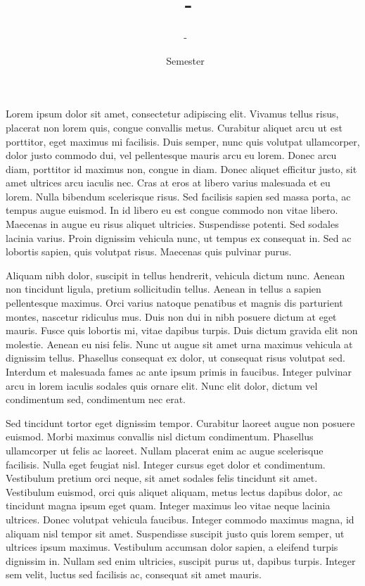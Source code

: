 \documentclass[12pt]{article}
\title{\COURSECODE\ - \FULLCOURSENAME}
\author{\PROFESSORNAME\ - \STUDENTNAME}
\date{\SEMESTER\ Semester \YEAR}
\theoremstyle{plain}
\theoremstyle{definition}
\begin{document}
\maketitle

\hfill


Lorem ipsum dolor sit amet, consectetur adipiscing elit. Vivamus tellus risus, placerat non lorem quis, congue convallis metus. Curabitur aliquet arcu ut est porttitor, eget maximus mi facilisis. Duis semper, nunc quis volutpat ullamcorper, dolor justo commodo dui, vel pellentesque mauris arcu eu lorem. Donec arcu diam, porttitor id maximus non, congue in diam. Donec aliquet efficitur justo, sit amet ultrices arcu iaculis nec. Cras at eros at libero varius malesuada et eu lorem. Nulla bibendum scelerisque risus. Sed facilisis sapien sed massa porta, ac tempus augue euismod. In id libero eu est congue commodo non vitae libero. Maecenas in augue eu risus aliquet ultricies. Suspendisse potenti. Sed sodales lacinia varius. Proin dignissim vehicula nunc, ut tempus ex consequat in. Sed ac lobortis sapien, quis volutpat risus. Maecenas quis pulvinar purus.

Aliquam nibh dolor, suscipit in tellus hendrerit, vehicula dictum nunc. Aenean non tincidunt ligula, pretium sollicitudin tellus. Aenean in tellus a sapien pellentesque maximus. Orci varius natoque penatibus et magnis dis parturient montes, nascetur ridiculus mus. Duis non dui in nibh posuere dictum at eget mauris. Fusce quis lobortis mi, vitae dapibus turpis. Duis dictum gravida elit non molestie. Aenean eu nisi felis. Nunc ut augue sit amet urna maximus vehicula at dignissim tellus. Phasellus consequat ex dolor, ut consequat risus volutpat sed. Interdum et malesuada fames ac ante ipsum primis in faucibus. Integer pulvinar arcu in lorem iaculis sodales quis ornare elit. Nunc elit dolor, dictum vel condimentum sed, condimentum nec erat.

Sed tincidunt tortor eget dignissim tempor. Curabitur laoreet augue non posuere euismod. Morbi maximus convallis nisl dictum condimentum. Phasellus ullamcorper ut felis ac laoreet. Nullam placerat enim ac augue scelerisque facilisis. Nulla eget feugiat nisl. Integer cursus eget dolor et condimentum. Vestibulum pretium orci neque, sit amet sodales felis tincidunt sit amet. Vestibulum euismod, orci quis aliquet aliquam, metus lectus dapibus dolor, ac tincidunt magna ipsum eget quam. Integer maximus leo vitae neque lacinia ultrices. Donec volutpat vehicula faucibus. Integer commodo maximus magna, id aliquam nisl tempor sit amet. Suspendisse suscipit justo quis lorem semper, ut ultrices ipsum maximus. Vestibulum accumsan dolor sapien, a eleifend turpis dignissim in. Nullam sed enim ultricies, suscipit purus ut, dapibus turpis. Integer sem velit, luctus sed facilisis ac, consequat sit amet mauris.
\end{document}

